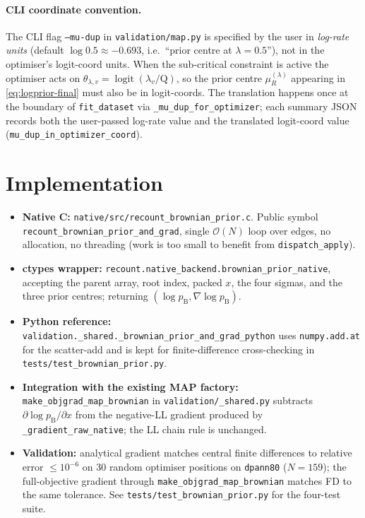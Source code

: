 \documentclass[11pt]{article}
\newcommand{\troot}{R}
\newcommand{\dup}{\lambda}             %
\newcommand{\loss}{\mu}                %
\DeclareMathOperator{\logit}{logit}
\theoremstyle{definition}
\begin{document}
\paragraph{CLI coordinate convention.}
The CLI flag \texttt{--mu-dup} in \texttt{validation/map.py} is
specified by the user in \emph{log-rate units} (default
$\log 0.5 \approx -0.693$, i.e.\ ``prior centre at $\dup = 0.5$''),
not in the optimiser's logit-coord units. When the sub-critical
constraint is active the optimiser acts on
$\theta_{\dup,v} = \logit(\dup_v / \mathrm{Q})$, so the prior centre
$\loss^{(\dup)}_\troot$ appearing in \eqref{eq:logprior-final} must
also be in logit-coords. The translation happens once at the
boundary of \texttt{fit\_dataset} via \texttt{\_mu\_dup\_for\_optimizer};
each summary JSON records both the user-passed log-rate value and
the translated logit-coord value (\texttt{mu\_dup\_in\_optimizer\_coord}).

\section{Implementation}

\begin{itemize}
\item \textbf{Native C:} \texttt{native/src/recount\_brownian\_prior.c}.
  Public symbol \texttt{recount\_brownian\_prior\_and\_grad}, single
  $\mathcal{O}(N)$ loop over edges, no allocation, no threading
  (work is too small to benefit from \texttt{dispatch\_apply}).
\item \textbf{ctypes wrapper:}
  \texttt{recount.native\_backend.brownian\_prior\_native}, accepting
  the parent array, root index, packed $x$, the four sigmas, and the
  three prior centres; returning $(\log p_{\mathrm{B}}, \nabla\log p_{\mathrm{B}})$.
\item \textbf{Python reference:}
  \texttt{validation.\_shared.\_brownian\_prior\_and\_grad\_python}
  uses \texttt{numpy.add.at} for the scatter-add and is kept for
  finite-difference cross-checking in
  \texttt{tests/test\_brownian\_prior.py}.
\item \textbf{Integration with the existing MAP factory:}
  \texttt{make\_objgrad\_map\_brownian} in
  \texttt{validation/\_shared.py} subtracts $\partial\log p_{\mathrm{B}}/\partial x$
  from the negative-LL gradient produced by
  \texttt{\_gradient\_raw\_native}; the LL chain rule is unchanged.
\item \textbf{Validation:} analytical gradient matches central
  finite differences to relative error $\le 10^{-6}$ on 30 random
  optimiser positions on \texttt{dpann80} ($N=159$); the
  full-objective gradient through
  \texttt{make\_objgrad\_map\_brownian} matches FD to the same
  tolerance. See \texttt{tests/test\_brownian\_prior.py} for the
  four-test suite.
\end{itemize}
\end{document}
